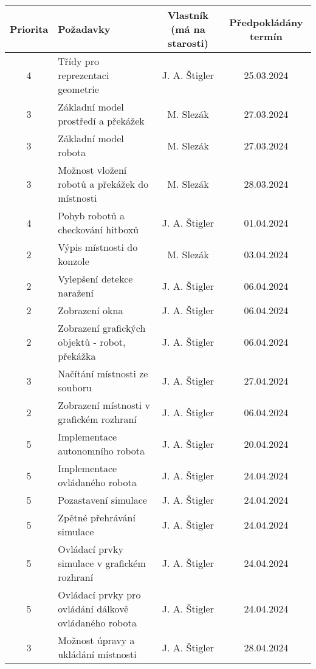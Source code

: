 \documentclass{article}
\begin{document}
\begin{table}[h]
    \centering
    \begin{tabular}{ |c|>{\raggedright\arraybackslash}p{4cm}|c|c| }
        \hline
        \rowcolor{blue!25}Priorita & Požadavky & Vlastník (má na starosti) &
        Předpokládány termín \\
        \hline
        \rowcolor{green!25}4 & Třídy pro reprezentaci geometrie &
            J. A. Štigler & 25.03.2024 \\
        \hline
        \rowcolor{green!25}3 & Základní model prostředí a překážek &
            M. Slezák & 27.03.2024 \\
        \hline
        \rowcolor{green!25}3 & Základní model robota & M. Slezák &
            27.03.2024 \\
        \hline
        \rowcolor{green!25}3 & Možnost vložení robotů a překážek do místnosti &
            M. Slezák & 28.03.2024 \\
        \hline
        \rowcolor{green!25}4 & Pohyb robotů a checkování hitboxů &
            J. A. Štigler & 01.04.2024 \\
        \hline
        \rowcolor{green!25}2 & Výpis místnosti do konzole & M. Slezák &
            03.04.2024 \\
        \hline
        2 & Vylepšení detekce naražení & J. A. Štigler & 06.04.2024 \\
        \hline
        2 & Zobrazení okna & J. A. Štigler & 06.04.2024 \\
        \hline
        2 & Zobrazení grafických objektů - robot, překážka & J. A. Štigler &
            06.04.2024 \\
        \hline
        3 & Načítání místnosti ze souboru & J. A. Štigler & 27.04.2024 \\
        \hline
        2 & Zobrazení místnosti v grafickém rozhraní & J. A. Štigler &
            06.04.2024 \\
        \hline
        5 & Implementace autonomního robota & J. A. Štigler & 20.04.2024 \\
        \hline
        5 & Implementace ovládaného robota & J. A. Štigler & 24.04.2024 \\
        \hline
        5 & Pozastavení simulace & J. A. Štigler & 24.04.2024 \\
        \hline
        5 & Zpětné přehrávání simulace & J. A. Štigler & 24.04.2024 \\
        \hline
        5 & Ovládací prvky simulace v grafickém rozhraní & J. A. Štigler &
            24.04.2024 \\
        \hline
        5 & Ovládací prvky pro ovládání dálkově ovládaného robota &
            J. A. Štigler & 24.04.2024 \\
        \hline
        3 & Možnost úpravy a ukládání místnosti & J. A. Štigler & 28.04.2024 \\
        \hline
    \end{tabular}
\end{table}
\end{document}
